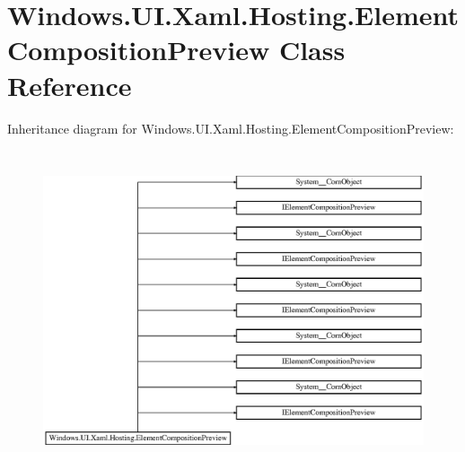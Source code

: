 \hypertarget{class_windows_1_1_u_i_1_1_xaml_1_1_hosting_1_1_element_composition_preview}{}\section{Windows.\+U\+I.\+Xaml.\+Hosting.\+Element\+Composition\+Preview Class Reference}
\label{class_windows_1_1_u_i_1_1_xaml_1_1_hosting_1_1_element_composition_preview}
Inheritance diagram for Windows.\+U\+I.\+Xaml.\+Hosting.\+Element\+Composition\+Preview\+:\begin{figure}[H]
\begin{center}
\leavevmode
\includegraphics[height=9.476923cm]{class_windows_1_1_u_i_1_1_xaml_1_1_hosting_1_1_element_composition_preview}
\end{center}
\end{figure}

